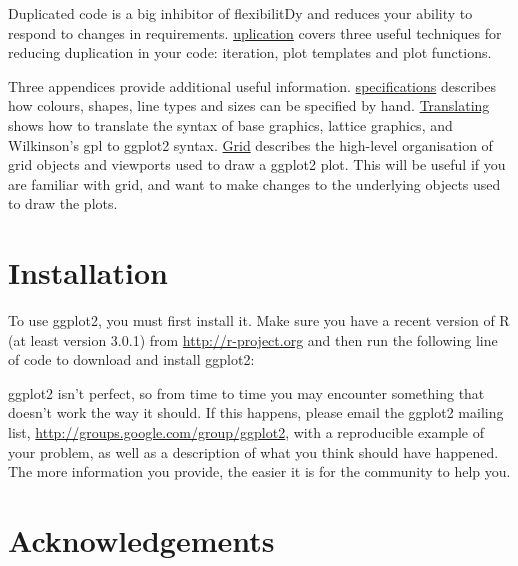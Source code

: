 Duplicated code is a big inhibitor of flexibilitDy and reduces your
ability to respond to changes in requirements.
\hyperref[cha:duplication]{uplication} covers three useful techniques
for reducing duplication in your code: iteration, plot templates and
plot functions.

Three appendices provide additional useful information.
\hyperref[cha:specifications]{specifications} describes how colours,
shapes, line types and sizes can be specified by hand.
\hyperref[cha:translating]{Translating} shows how to translate the
syntax of base graphics, lattice graphics, and Wilkinson's gpl to
ggplot2 syntax. \hyperref[cha:grid]{Grid} describes the high-level
organisation of grid objects and viewports used to draw a ggplot2 plot.
This will be useful if you are familiar with grid, and want to make
changes to the underlying objects used to draw the plots.

\section{Installation}\label{sec:installation}

To use ggplot2, you must first install it. Make sure you have a recent
version of R (at least version 3.0.1) from \url{http://r-project.org}
and then run the following line of code to download and install ggplot2:

\begin{Shaded}
\begin{Highlighting}[]
\NormalTok{(}\NormalTok{)}
\end{Highlighting}
\end{Shaded}

ggplot2 isn't perfect, so from time to time you may encounter something
that doesn't work the way it should. If this happens, please email the
ggplot2 mailing list, \url{http://groups.google.com/group/ggplot2}, with
a reproducible example of your problem, as well as a description of what
you think should have happened. The more information you provide, the
easier it is for the community to help you.

\section{Acknowledgements}\label{sec:acknolwedgements}

